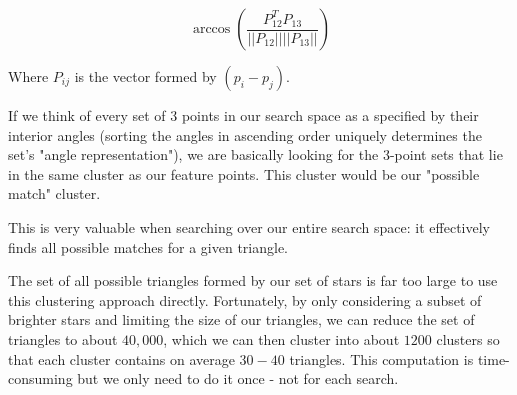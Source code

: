 \documentclass[paper=a4, fontsize=11pt]{scrartcl} %
\begin{document}
$$\arccos\left(\frac{P_{12}^TP_{13}}{||P_{12}||||P_{13}||}\right)$$

Where $P_{ij}$ is the vector formed by $(p_i - p_j)$.

If we think of every set of 3 points in our search space as a specified by their interior angles (sorting the angles in ascending order uniquely determines the set's "angle representation"), we are basically looking for the 3-point sets that lie in the same cluster as our feature points. This cluster would be our "possible match" cluster.

This is very valuable when searching over our entire search space: it effectively finds all possible matches for a given triangle. 



The set of all possible triangles formed by our set of stars is far too large to use this clustering approach directly. Fortunately, by only considering a subset of brighter stars and limiting the size of our triangles, we can reduce the set of triangles to about $40,000$, which we can then cluster into about $1200$ clusters so that each cluster contains on average $30-40$ triangles.  This computation is time-consuming but we only need to do it once - not for each search.

\end{document}
